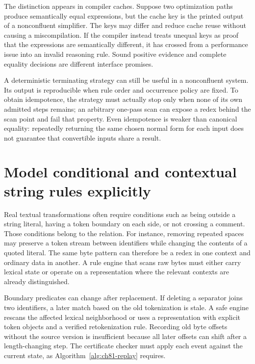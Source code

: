 The distinction appears in compiler caches.
Suppose two optimization paths produce semantically equal expressions, but the cache key is the printed output of a nonconfluent simplifier.
The keys may differ and reduce cache reuse without causing a miscompilation.
If the compiler instead treats unequal keys as proof that the expressions are semantically different, it has crossed from a performance issue into an invalid reasoning rule.
Sound positive evidence and complete equality decisions are different interface promises.

A deterministic terminating strategy can still be useful in a nonconfluent system.
Its output is reproducible when rule order and occurrence policy are fixed.
To obtain idempotence, the strategy must actually stop only when none of its own admitted steps remains; an arbitrary one-pass scan can expose a redex behind the scan point and fail that property.
Even idempotence is weaker than canonical equality: repeatedly returning the same chosen normal form for each input does not guarantee that convertible inputs share a result.

\section{Model conditional and contextual string rules explicitly}
\label{sec:ch81-conditional}
Real textual transformations often require conditions such as being outside a string literal, having a token boundary on each side, or not crossing a comment.
Those conditions belong to the relation.
For instance, removing repeated spaces may preserve a token stream between identifiers while changing the contents of a quoted literal.
The same byte pattern can therefore be a redex in one context and ordinary data in another.
A rule engine that scans raw bytes must either carry lexical state or operate on a representation where the relevant contexts are already distinguished.

Boundary predicates can change after replacement.
If deleting a separator joins two identifiers, a later match based on the old tokenization is stale.
A safe engine rescans the affected lexical neighborhood or uses a representation with explicit token objects and a verified retokenization rule.
Recording old byte offsets without the source version is insufficient because all later offsets can shift after a length-changing step.
The certificate checker must apply each event against the current state, as Algorithm~\ref{alg:ch81-replay} requires.

